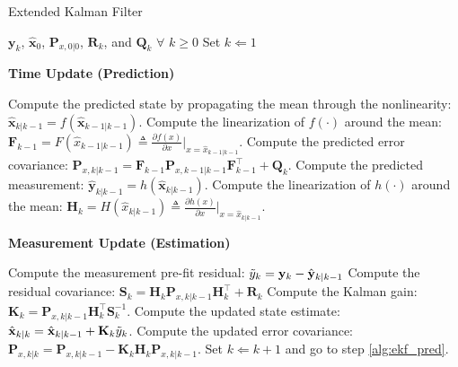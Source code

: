 \begin{algorithm}[!htb]
\caption{Extended Kalman Filter}\label{alg:ekf}
\begin{algorithmic}[1]
\footnotesize \REQUIRE $\mathbf{y}_{k}$, $\hat{\mathbf{x}}_0$, $\mathbf{P}_{x,0|0}$, $\mathbf{R}_{k}$, and $\mathbf{Q}_{k}$ $\forall$ $k \geq 0$
\medskip
\STATE Set ${k} \Leftarrow 1$
\begin{center}
\textbf{Time Update (Prediction)}
\end{center}
\STATE \label{alg:ekf_pred} Compute the predicted state by propagating the mean through the nonlinearity: $\hat{\mathbf{x}}_{k|k-1} = f(\hat{\mathbf{x}}_{k-1|k-1})$.
\STATE \label{alg:ekf_linf} Compute the linearization of $f(\cdot)$ around the mean: $ \mathbf{F}_{k-1} = F(\hat{x}_{k-1|k-1}) \triangleq \frac{\partial f(x)}{\partial x} \Bigr\rvert_{x = \hat{x}_{k-1|k-1}}$.
\STATE Compute the predicted error covariance:
$\mathbf{P}_{x,k|k-1} = \mathbf{F}_{k-1} \mathbf{P}_{x,k-1|k-1}
\mathbf{F}_{k-1}^\top + \mathbf{Q}_k$. \label{alg:ekf_P_pred}
\medskip
\STATE \label{alg:ekf_meas} Compute the predicted measurement: $\hat{\mathbf{y}}_{k|k-1} = h(\hat{\mathbf{x}}_{k|k-1})$.
\STATE \label{alg:ekf_linh} Compute the linearization of $h(\cdot)$ around the mean: $ \mathbf{H}_{k} = H(\hat{x}_{k|k-1}) \triangleq \frac{\partial h(x)}{\partial x} \Bigr\rvert_{x = \hat{x}_{k|k-1}}$.
\begin{center}
\medskip %
\textbf{Measurement Update (Estimation)}
\end{center}
\STATE \label{alg:ekf_innov} Compute the measurement pre-fit residual: $\Tilde{y}_{k} = \mathbf{y}_{k}-\hat{\mathbf{y}}_{k|k-1}$
\STATE Compute the residual covariance: $\mathbf{S}_{k} = \mathbf{H}_{k}\mathbf{P}_{x,k|k-1}\mathbf{H}_{k}^\top + \mathbf{R}_{k}$
\STATE Compute the Kalman gain: $\mathbf{K}_{k}= \mathbf{P}_{x,k|k-1}\mathbf{H}_{k}^\top
\mathbf{S}_{k}^{-1}$.
\STATE \label{alg:ekf_state_post} Compute the updated state estimate: $\hat{\mathbf{x}}_{k|k} = \hat{\mathbf{x}}_{k|k-1}+\mathbf{K}_{k}\Tilde{y}_{k}$.
\STATE \label{alg:ekf_cov_post} Compute the updated error covariance:
$\mathbf{P}_{x,k|k} = \mathbf{P}_{x,k|k-1} - \mathbf{K}_{k}\mathbf{H}_{k}\mathbf{P}_{x,k|k-1}$.
\medskip
\STATE Set $k \Leftarrow k+1$ and go to step
\ref{alg:ekf_pred}.
\end{algorithmic}
\end{algorithm}

